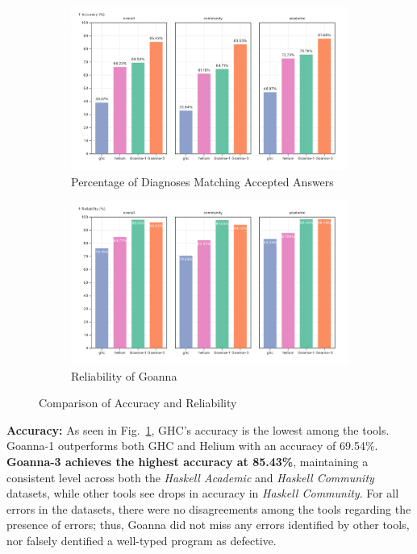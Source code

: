 \documentclass[pdflatex,sn-mathphys-num]{sn-jnl}%
\begin{document}
\begin{figure}[ht!]
    \centering
    \begin{subfigure}{0.49\linewidth}
        \centering
        \includegraphics[width=\linewidth]{images/accuracy.png}
        \caption{Percentage of Diagnoses Matching Accepted Answers} 
        \label{fig:accuracy}
    \end{subfigure}
    \hfill
    \begin{subfigure}{0.49\linewidth}
        \centering
        \includegraphics[width=\linewidth]{images/Reliability.png}
        \caption{Reliability of Goanna} 
        \label{fig:reliability}
    \end{subfigure}
    \caption{Comparison of Accuracy and Reliability}
    \label{fig:comparison}
\end{figure}

\textbf{Accuracy:} As seen in Fig.~\ref{fig:accuracy}, GHC's accuracy is the lowest among the tools. Goanna-1 outperforms both GHC and Helium with an accuracy of 69.54\%. \textbf{Goanna-3 achieves the highest accuracy at 85.43\%}, maintaining a consistent level across both the \textit{Haskell Academic} and \textit{Haskell Community} datasets, while other tools see drops in accuracy in \textit{Haskell Community}. For all errors in the datasets, there were no disagreements among the tools regarding the presence of errors; thus, Goanna did not miss any errors identified by other tools, nor falsely dentified a well-typed program as defective.
\end{document}
